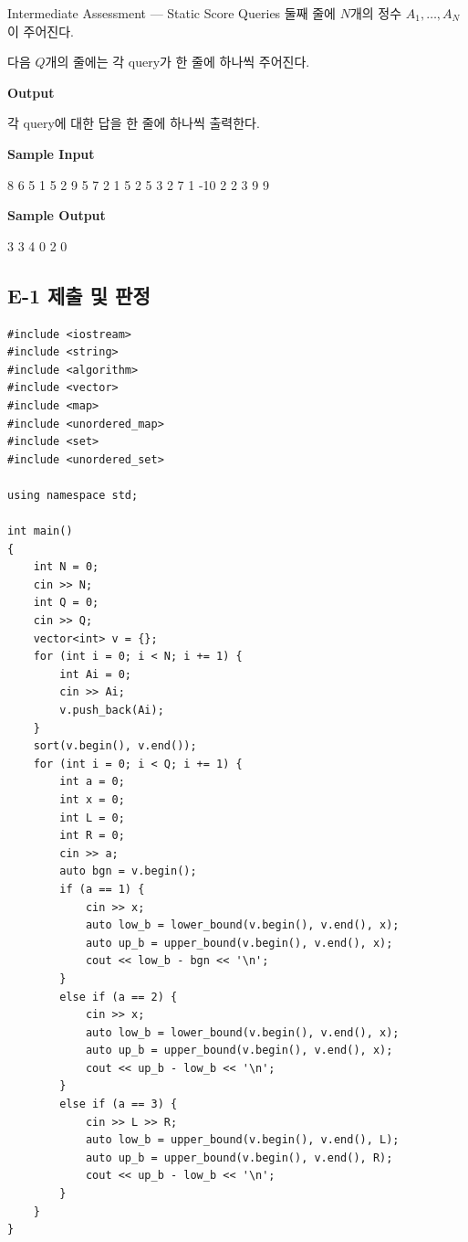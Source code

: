 \begin{problembox}{Intermediate Assessment --- Static Score Queries}
둘째 줄에 $N$개의 정수 $A_1,\dots,A_N$이 주어진다.

다음 $Q$개의 줄에는 각 query가 한 줄에 하나씩 주어진다.

\textbf{Output}

각 query에 대한 답을 한 줄에 하나씩 출력한다.

\textbf{Sample Input}
\begin{TextBlock}
8 6
5 1 5 2 9 5 7 2
1 5
2 5
3 2 7
1 -10
2 2
3 9 9
\end{TextBlock}

\textbf{Sample Output}
\begin{TextBlock}
3
3
4
0
2
0
\end{TextBlock}
\end{problembox}

\subsection{E-1 제출 및 판정}

\begin{answerbox}[학습자 제출 코드]
\begin{lstlisting}
#include <iostream>
#include <string>
#include <algorithm>
#include <vector>
#include <map>
#include <unordered_map>
#include <set>
#include <unordered_set>

using namespace std;

int main()
{
    int N = 0;
    cin >> N;
    int Q = 0;
    cin >> Q;
    vector<int> v = {};
    for (int i = 0; i < N; i += 1) {
        int Ai = 0;
        cin >> Ai;
        v.push_back(Ai);
    }
    sort(v.begin(), v.end());
    for (int i = 0; i < Q; i += 1) {
        int a = 0;
        int x = 0;
        int L = 0;
        int R = 0;
        cin >> a;
        auto bgn = v.begin();
        if (a == 1) {
            cin >> x;
            auto low_b = lower_bound(v.begin(), v.end(), x);
            auto up_b = upper_bound(v.begin(), v.end(), x);
            cout << low_b - bgn << '\n';
        }
        else if (a == 2) {
            cin >> x;
            auto low_b = lower_bound(v.begin(), v.end(), x);
            auto up_b = upper_bound(v.begin(), v.end(), x);
            cout << up_b - low_b << '\n';
        }
        else if (a == 3) {
            cin >> L >> R;
            auto low_b = upper_bound(v.begin(), v.end(), L);
            auto up_b = upper_bound(v.begin(), v.end(), R);
            cout << up_b - low_b << '\n';
        }
    }
}
\end{lstlisting}
\end{answerbox}

